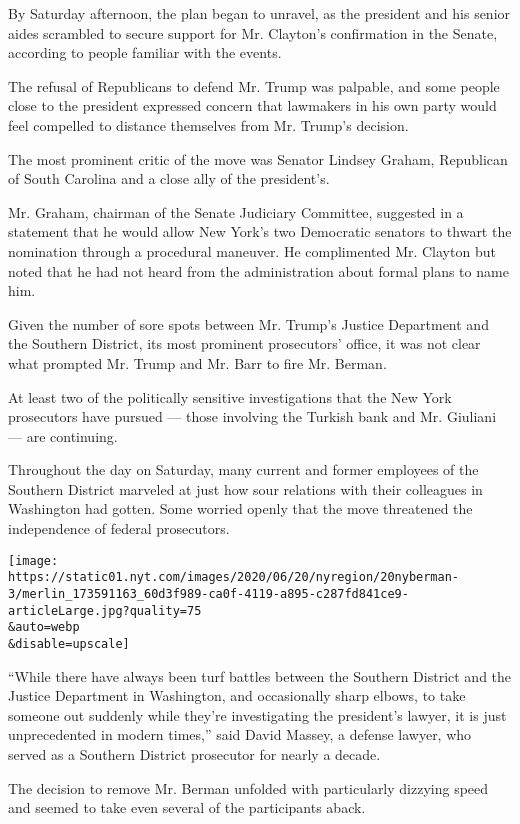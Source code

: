 By Saturday afternoon, the plan began to unravel, as the president and
his senior aides scrambled to secure support for Mr. Clayton's
confirmation in the Senate, according to people familiar with the
events.

The refusal of Republicans to defend Mr. Trump was palpable, and some
people close to the president expressed concern that lawmakers in his
own party would feel compelled to distance themselves from Mr. Trump's
decision.

The most prominent critic of the move was Senator Lindsey Graham,
Republican of South Carolina and a close ally of the president's.

Mr. Graham, chairman of the Senate Judiciary Committee, suggested in a
statement that he would allow New York's two Democratic senators to
thwart the nomination through a procedural maneuver. He complimented Mr.
Clayton but noted that he had not heard from the administration about
formal plans to name him.

Given the number of sore spots between Mr. Trump's Justice Department
and the Southern District, its most prominent prosecutors' office, it
was not clear what prompted Mr. Trump and Mr. Barr to fire Mr. Berman.

At least two of the politically sensitive investigations that the New
York prosecutors have pursued --- those involving the Turkish bank and
Mr. Giuliani --- are continuing.

Throughout the day on Saturday, many current and former employees of the
Southern District marveled at just how sour relations with their
colleagues in Washington had gotten. Some worried openly that the move
threatened the independence of federal prosecutors.

\texttt{[image: https://static01.nyt.com/images/2020/06/20/nyregion/20nyberman-3/merlin\_173591163\_60d3f989-ca0f-4119-a895-c287fd841ce9-articleLarge.jpg?quality=75\\\&auto=webp\\\&disable=upscale]}

``While there have always been turf battles between the Southern
District and the Justice Department in Washington, and occasionally
sharp elbows, to take someone out suddenly while they're investigating
the president's lawyer, it is just unprecedented in modern times,'' said
David Massey, a defense lawyer, who served as a Southern District
prosecutor for nearly a decade.

The decision to remove Mr. Berman unfolded with particularly dizzying
speed and seemed to take even several of the participants aback.

